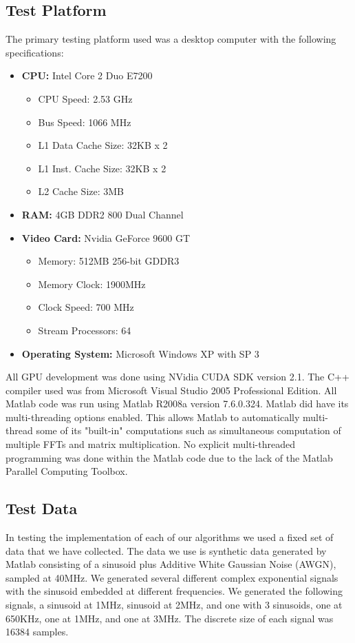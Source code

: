 \subsection{Test Platform}
\label{sect:test_platform}
The primary testing platform used was a desktop computer with the following specifications:
\begin{itemize}
\item \textbf{CPU:} Intel Core 2 Duo E7200
	\begin{itemize}
	\item CPU Speed: 2.53 GHz
	\item Bus Speed: 1066 MHz
	\item L1 Data Cache Size: 32KB x 2
	\item L1 Inst. Cache Size: 32KB x 2
	\item L2 Cache Size: 3MB
	\end{itemize}
\item \textbf{RAM:} 4GB DDR2 800 Dual Channel
\item \textbf{Video Card:} Nvidia GeForce 9600 GT
	\begin{itemize}
	\item Memory: 512MB 256-bit GDDR3
	\item Memory Clock: 1900MHz
	\item Clock Speed: 700 MHz
	\item Stream Processors: 64
	\end{itemize}
\item \textbf{Operating System:} Microsoft Windows XP with SP 3
\end{itemize}

All GPU development was done using NVidia CUDA SDK version 2.1.  The C++ compiler used was from Microsoft Visual Studio 2005 Professional Edition.  All Matlab code was run using Matlab R2008a version 7.6.0.324.  Matlab did have its multi-threading options enabled.  This allows Matlab to automatically multi-thread some of its "built-in" computations such as simultaneous computation of multiple FFTs and matrix multiplication.  No explicit multi-threaded programming was done within the Matlab code due to the lack of the Matlab Parallel Computing Toolbox.

\subsection{Test Data}
In testing the implementation of each of our algorithms we used a fixed set of data that we have collected.  The data we use is synthetic data generated by Matlab consisting of a sinusoid plus Additive White Gaussian Noise (AWGN), sampled at 40MHz.  We generated several different complex exponential signals with the sinusoid embedded at different frequencies.  We generated the following signals, a sinusoid at 1MHz, sinusoid at 2MHz, and one with 3 sinusoids, one at 650KHz, one at 1MHz, and one at 3MHz.  The discrete size of each signal was 16384 samples.

